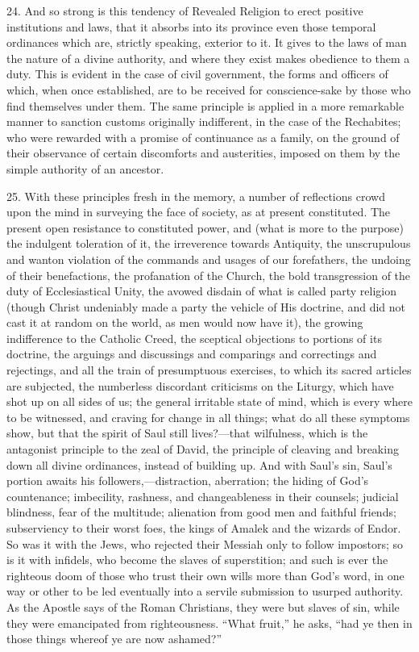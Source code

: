 24. And so strong is this tendency of Revealed Religion to erect
positive institutions and laws, that it absorbs into its province even
those temporal ordinances which are, strictly speaking, exterior to
it. It gives to the laws of man the nature of a divine authority, and
where they exist makes obedience to them a duty. This is evident in
the case of civil government, the forms and officers of which, when
once established, are to be received for conscience-sake by those who
find themselves under them. The same principle is applied in a more
remarkable manner to sanction customs originally indifferent, in the
case of the Rechabites; who were rewarded with a promise of
continuance as a family, on the ground of their observance of certain
discomforts and austerities, imposed on them by the simple authority
of an ancestor.

25. With these principles fresh in the memory, a number of
reflections crowd upon the mind in surveying the face of society, as
at present constituted. The present open resistance to constituted
power, and (what is more to the purpose) the indulgent toleration of
it, the irreverence towards Antiquity, the unscrupulous and wanton
violation of the commands and usages of our forefathers, the undoing
of their benefactions, the profanation of the Church, the bold
transgression of the duty of Ecclesiastical Unity, the avowed disdain
of what is called party religion (though Christ undeniably made a
party the vehicle of His doctrine, and did not cast it at random on
the world, as men would now have it), the growing indifference to the
Catholic Creed, the sceptical objections to portions of its doctrine,
the arguings and discussings and comparings and correctings and
rejectings, and all the train of presumptuous exercises, to which its
sacred articles are subjected, the numberless discordant criticisms on
the Liturgy, which have shot up on all sides of us; the general
irritable state of mind, which is every where to be witnessed, and
craving for change in all things; what do all these symptoms show, but
that the spirit of Saul still lives?—that wilfulness, which is the
antagonist principle to the zeal of David, the principle of cleaving
and breaking down all divine ordinances, instead of building up. And
with Saul's sin, Saul's portion awaits his followers,—distraction,
aberration; the hiding of God's countenance; imbecility, rashness, and
changeableness in their counsels; judicial blindness, fear of the
multitude; alienation from good men and faithful friends; subserviency
to their worst foes, the kings of Amalek and the wizards of Endor. So
was it with the Jews, who rejected their Messiah only to follow
impostors; so is it with infidels, who become the slaves of
superstition; and such is ever the righteous doom of those who trust
their own wills more than God's word, in one way or other to be led
eventually into a servile submission to usurped authority. As the
Apostle says of the Roman Christians, they were but slaves of sin,
while they were emancipated from righteousness. ``What
fruit,'' he asks, ``had ye then in those things whereof ye are
now ashamed?''

